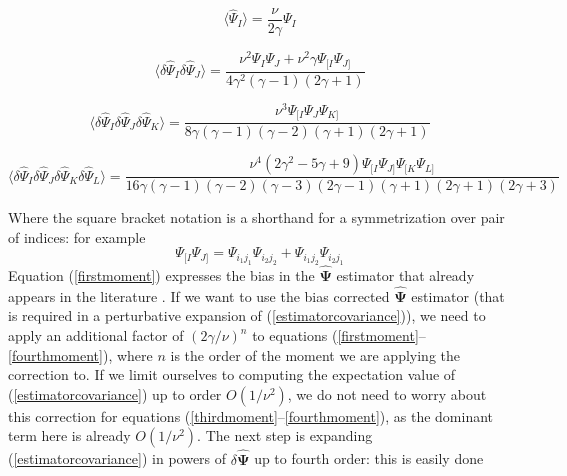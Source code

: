 \documentclass[reprint,aps,prd,superscriptaddress,showkeys,showpacs]{revtex4-1}
\newcommand{\bbh}[1]{\mathbf{\hat{#1}}}
\newcommand{\h}[1]{\hat{#1}}
\begin{document}
\begin{widetext}

\begin{equation}
\label{firstmoment}
\langle\h{\Psi}_I\rangle = \frac{\nu}{2\gamma}\Psi_I
\end{equation}

\begin{equation}
\label{secondmoment}
\langle\delta\h{\Psi}_I\delta\h{\Psi}_J\rangle = \frac{\nu^2\Psi_I\Psi_J + \nu^2\gamma\Psi_{[I}\Psi_{J]}}{4\gamma^2(\gamma-1)(2\gamma+1)}
\end{equation}

\begin{equation}
\label{thirdmoment}
\langle\delta\h{\Psi}_I\delta\h{\Psi}_J\delta\h{\Psi}_K\rangle = \frac{\nu^3\Psi_{[I}\Psi_J\Psi_{K]}}{8\gamma(\gamma-1)(\gamma-2)(\gamma+1)(2\gamma+1)}
\end{equation}

\begin{equation}
\label{fourthmoment}
\langle\delta\h{\Psi}_I\delta\h{\Psi}_J\delta\h{\Psi}_K\delta\h{\Psi}_L\rangle = \frac{\nu^4(2\gamma^2-5\gamma+9)\Psi_{[I}\Psi_{J]}\Psi_{[K}\Psi_{L]}}{16\gamma(\gamma-1)(\gamma-2)(\gamma-3)(2\gamma-1)(\gamma+1)(2\gamma+1)(2\gamma+3)}
\end{equation}

\end{widetext}
%
Where the square bracket notation is a shorthand for a symmetrization over pair of indices: for example
\begin{equation}
\Psi_{[I}\Psi_{J]} = \Psi_{i_1j_1}\Psi_{i_2j_2} + \Psi_{i_1j_2}\Psi_{i_2j_1}
\end{equation}
%
Equation (\ref{firstmoment}) expresses the bias in the $\bbh{\Psi}$ estimator that already appears in the literature \citep{Hartlap07}. If we want to use the bias corrected $\bbh{\Psi}$ estimator (that is required in a perturbative expansion of (\ref{estimatorcovariance})), we need to apply an additional factor of $(2\gamma/\nu)^n$ to equations (\ref{firstmoment}--\ref{fourthmoment}), where $n$ is the order of the moment we are applying the correction to. If we limit ourselves to computing the expectation value of (\ref{estimatorcovariance}) up to order $O(1/\nu^2)$, we do not need to worry about this correction for equations (\ref{thirdmoment}--\ref{fourthmoment}), as the dominant term here is already $O(1/\nu^2)$. The next step is expanding (\ref{estimatorcovariance}) in powers of $\delta\bbh{\Psi}$ up to fourth order: this is easily done
\end{document}
